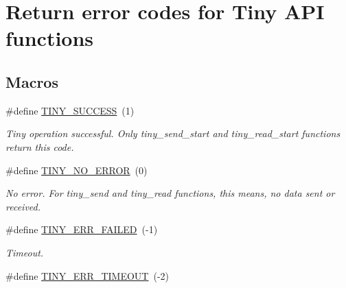 \hypertarget{group__ERROR__FLAGS}{}\section{Return error codes for Tiny A\+PI functions}
\label{group__ERROR__FLAGS}
\subsection*{Macros}
\begin{DoxyCompactItemize}
\item 
\mbox{\label{group__ERROR__FLAGS_ga16cd043c890ed1fa381b3a20f75a626c}} 
\#define \hyperlink{group__ERROR__FLAGS_ga16cd043c890ed1fa381b3a20f75a626c}{T\+I\+N\+Y\+\_\+\+S\+U\+C\+C\+E\+SS}~(1)
\begin{DoxyCompactList}\small\item\em Tiny operation successful. Only tiny\+\_\+send\+\_\+start and tiny\+\_\+read\+\_\+start functions return this code. \end{DoxyCompactList}\item 
\mbox{\label{group__ERROR__FLAGS_ga69c869a686b67bf0b7b8115599515d61}} 
\#define \hyperlink{group__ERROR__FLAGS_ga69c869a686b67bf0b7b8115599515d61}{T\+I\+N\+Y\+\_\+\+N\+O\+\_\+\+E\+R\+R\+OR}~(0)
\begin{DoxyCompactList}\small\item\em No error. For tiny\+\_\+send and tiny\+\_\+read functions, this means, no data sent or received. \end{DoxyCompactList}\item 
\mbox{\label{group__ERROR__FLAGS_ga84e6ca143550038e1a71cf36078d1926}} 
\#define \hyperlink{group__ERROR__FLAGS_ga84e6ca143550038e1a71cf36078d1926}{T\+I\+N\+Y\+\_\+\+E\+R\+R\+\_\+\+F\+A\+I\+L\+ED}~(-\/1)
\begin{DoxyCompactList}\small\item\em Timeout. \end{DoxyCompactList}\item 
\mbox{\label{group__ERROR__FLAGS_gac9ba8076a1eb8613e8d1f07629ff0cd1}} 
\#define \hyperlink{group__ERROR__FLAGS_gac9ba8076a1eb8613e8d1f07629ff0cd1}{T\+I\+N\+Y\+\_\+\+E\+R\+R\+\_\+\+T\+I\+M\+E\+O\+UT}~(-\/2)

\end{DoxyCompactItemize}
